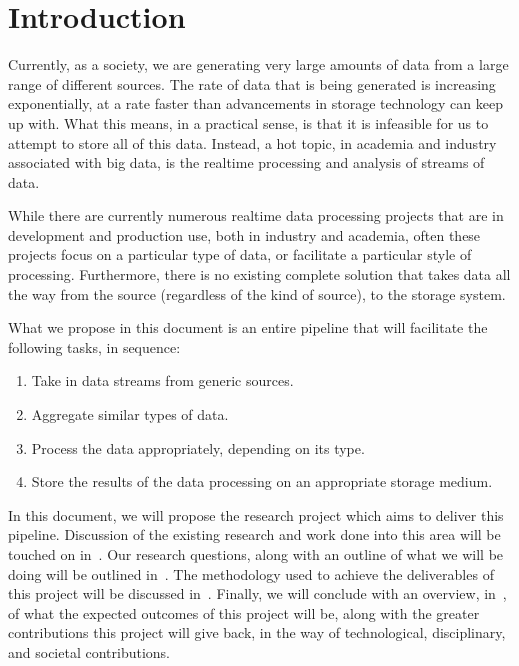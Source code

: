 \documentclass[a4paper,11pt]{article}
\begin{document}
\section{Introduction} %
\label{sec:introduction}
Currently, as a society, we are generating very large amounts of data from a large range of different sources. The rate
of data that is being generated is increasing exponentially, at a rate faster than advancements in storage technology can keep up
with. What this means, in a practical sense, is that it is infeasible for us to attempt to store all of this data. Instead, a hot
topic, in academia and industry associated with big data, is the realtime processing and analysis of streams of data.

While there are currently numerous realtime data processing projects that are in development and production use, both in industry
and academia, often these projects focus on a particular type of data, or facilitate a particular style of processing.
Furthermore, there is no existing complete solution that takes data all the way from the source (regardless of the kind of source), to the storage system.

What we propose in this document is an entire pipeline that will facilitate the following tasks, in sequence:

\begin{enumerate}
  \item Take in data streams from generic sources.
  \item Aggregate similar types of data.
  \item Process the data appropriately, depending on its type.
  \item Store the results of the data processing on an appropriate storage medium.
\end{enumerate}

In this document, we will propose the research project which aims to deliver this pipeline. Discussion of the
existing research and work done into this area will be touched on in~. Our research questions,
along with an outline of what we will be doing will be outlined in~. The methodology used to
achieve the deliverables of this project will be discussed in~. Finally, we will conclude with
an overview, in~, of what the expected outcomes of this project will be, along with the greater contributions this project will give
back, in the way of technological, disciplinary, and societal contributions.
\end{document}
